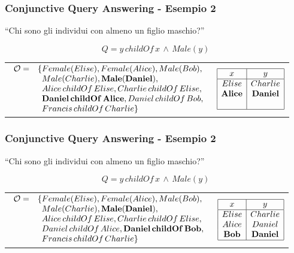 \documentclass[8pt]{beamer}
\begin{document}
\begin{frame}
\frametitle{Conjunctive Query Answering - Esempio 2}
\begin{center}
``Chi sono gli individui con almeno un figlio maschio?'' 
\end{center}
\[
 Q=y\,childOf\,x\,\wedge\,Male(y)
\]
\vspace{\baselineskip}

\begin{tabular}{lc}
$\begin{array}{cl}
  \Ont  =  &  \{Female(Elise),  Female(Alice), Male(Bob), \\
  &\phantom{\{}Male(Charlie), \mathbf{Male(Daniel)}, \\
  &\phantom{\{}Alice\,childOf\,Elise, Charlie\,childOf\,Elise, \\
  &\phantom{\{}\mathbf{Daniel\,childOf\,Alice}, Daniel\,childOf\,Bob, \\
  &\phantom{\{}Francis\,childOf\,Charlie \}\\
\end{array}$ & 
$\begin{array}{|c|c|}
  \hline
  x & y\\
  \hline
  Elise&Charlie\\
  \mathbf{Alice}&\mathbf{Daniel}\\
  \phantom{Bob}&\phantom{Daniel}\\
  \hline
\end{array}$ \\
\end{tabular}
\end{frame}

\begin{frame}
\frametitle{Conjunctive Query Answering - Esempio 2}
\begin{center}
``Chi sono gli individui con almeno un figlio maschio?'' 
\end{center}
\[
 Q=y\,childOf\,x\,\wedge\,Male(y)
\]
\vspace{\baselineskip}

\begin{tabular}{lc}
$\begin{array}{cl}
  \Ont  =  &  \{Female(Elise),  Female(Alice), Male(Bob), \\
  &\phantom{\{}Male(Charlie), \mathbf{Male(Daniel)}, \\
  &\phantom{\{}Alice\,childOf\,Elise, Charlie\,childOf\,Elise, \\
  &\phantom{\{}Daniel\,childOf\,Alice, \mathbf{Daniel\,childOf\,Bob}, \\
  &\phantom{\{}Francis\,childOf\,Charlie \}\\
\end{array}$ & 
$\begin{array}{|c|c|}
  \hline
  x & y\\
  \hline
  Elise&Charlie\\
  Alice&Daniel\\
  \mathbf{Bob}&\mathbf{Daniel}\\
  \hline
\end{array}$ \\
\end{tabular}
\end{frame}
\end{document}
